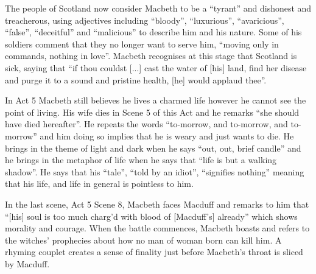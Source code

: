 \documentclass{article}
\begin{document}
The people of Scotland now consider Macbeth to be a ``tyrant'' and dishonest and treacherous, using adjectives including ``bloody'', ``luxurious'', ``avaricious'', ``false'', ``deceitful'' and ``malicious'' to describe him and his nature.  Some of his soldiers comment that they no longer want to serve him, ``moving only in commands, nothing in love''.  Macbeth recognises at this stage that Scotland is sick, saying that ``if thou couldst [...] cast the water of [his] land, find her disease and purge it to a sound and pristine health, [he] would applaud thee''.

In Act 5 Macbeth still believes he lives a charmed life however he cannot see the point of living.  His wife dies in Scene 5 of this Act and he remarks ``she should have died hereafter''.  He repeats the words ``to-morrow, and to-morrow, and to-morrow'' and him doing so implies that he is weary and just wants to die.  He brings in the theme of light and dark when he says ``out, out, brief candle'' and he brings in the metaphor of life when he says that ``life is but a walking shadow''.  He says that his ``tale'', ``told by an idiot'', ``signifies nothing'' meaning that his life, and life in general is pointless to him.

In the last scene, Act 5 Scene 8, Macbeth faces Macduff and remarks to him that ``[his] soul is too much charg'd with blood of [Macduff's] already'' which shows morality and courage.  When the battle commences, Macbeth boasts and refers to the witches' prophecies about how no man of woman born can kill him.  A rhyming couplet creates a sense of finality just before Macbeth's throat is sliced by Macduff.

 
\end{document}
